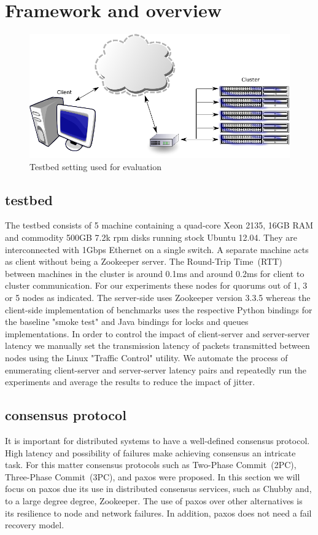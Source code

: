 \section{Framework and overview}\label{sec:framework}

\begin{figure}[h]
\centering
\includegraphics[scale=0.85]{img/framework.eps}
\caption{Testbed setting used for evaluation}
\label{fig:framework}
\end{figure}

\subsection{testbed}
The testbed consists of 5 machine containing a quad-core Xeon 2135, 16GB RAM and commodity 500GB 7.2k rpm disks running stock Ubuntu 12.04. They are interconnected with 1Gbps Ethernet on a single switch. A separate machine acts as client without being a Zookeeper server. The Round-Trip Time~(RTT) between machines in the cluster is around 0.1ms and around 0.2ms for client to cluster communication. For our experiments these nodes for quorums out of 1, 3 or 5 nodes as indicated. The server-side uses Zookeeper version 3.3.5 whereas the client-side implementation of benchmarks uses the respective Python bindings for the baseline "smoke test" and Java bindings for locks and queues implementations.
In order to control the impact of client-server and server-server latency we manually set the transmission latency of packets transmitted between nodes using the Linux "Traffic Control" utility. We automate the process of enumerating client-server and server-server latency pairs and repeatedly run the experiments and average the results to reduce the impact of jitter.

\subsection{consensus protocol}
It is important for distributed systems to have a well-defined consensus protocol. High latency and possibility of failures make achieving consensus an intricate task. For this matter consensus protocols such as Two-Phase Commit~(2PC), Three-Phase Commit~(3PC), and paxos were proposed. In this section we will focus on paxos due its use in distributed consensus services, such as Chubby and, to a large degree degree, Zookeeper. The use of paxos over other alternatives is its resilience to node and network failures. In addition, paxos does not need a fail recovery model.

